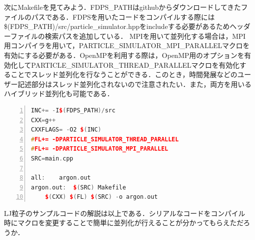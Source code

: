 \documentclass{jspf}            %
\begin{document}
次にMakefileを見てみよう．FDPS\_PATHはgithubからダウンロードしてきたファイルのパスである．FDPSを用いたコードをコンパイルする際には\$(FDPS\_PATH)/src/particle\_simulator.hppをincludeする必要があるためヘッダーファイルの検索パスを追加している．
MPIを用いて並列化する場合は，MPI用コンパイラを用いて，PARTICLE\_SIMULATOR\_MPI\_PARALLELマクロを有効にする必要がある．OpenMPを利用する際は，OpenMP用のオプションを有効化してPARTICLE\_SIMULATOR\_THREAD\_PARALLELマクロを有効化することでスレッド並列化を行なうことができる．このとき，時間発展などのユーザー記述部分はスレッド並列化されないので注意されたい．また，両方を用いるハイブリッド並列化も可能である．
\begin{lstlisting}[language=c++,numbers=left,numbersep=5pt,frame=single,basicstyle=\footnotesize]
INC+= -I$(FDPS_PATH)/src
CXX=g++
CXXFLAGS= -O2 $(INC)
#FL+= -DPARTICLE_SIMULATOR_THREAD_PARALLEL
#FL+= -DPARTICLE_SIMULATOR_MPI_PARALLEL
SRC=main.cpp

all:	argon.out
argon.out:	$(SRC) Makefile
	$(CXX) $(FL) $(SRC) -o argon.out
\end{lstlisting}

LJ粒子のサンプルコードの解説は以上である．シリアルなコードをコンパイル時にマクロを変更することで簡単に並列化が行えることが分かってもらえただろうか．

\end{document}
